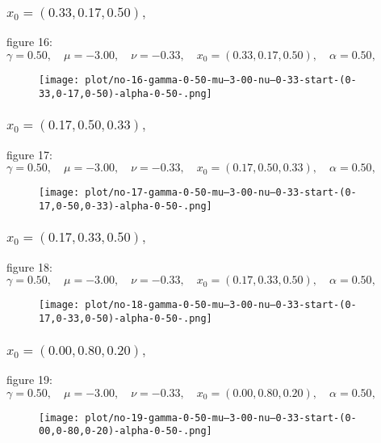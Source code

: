 \documentclass[a4paper]{article}
\begin{document}
\begin{multicols*}{2}
   \subsubsection{\(x_0 = (0.33,0.17,0.50),\quad \)}
   
figure 16: \(\gamma = 0.50,\quad \mu = -3.00,\quad \nu = -0.33,\quad x_0 = (0.33,0.17,0.50),\quad \alpha = 0.50,\quad \)
   \begin{figure}[H]
   \centering
   \texttt{[image: plot/no-16-gamma-0-50-mu--3-00-nu--0-33-start-(0-33,0-17,0-50)-alpha-0-50-.png]}
   \end{figure}
   

   \subsubsection{\(x_0 = (0.17,0.50,0.33),\quad \)}
   
figure 17: \(\gamma = 0.50,\quad \mu = -3.00,\quad \nu = -0.33,\quad x_0 = (0.17,0.50,0.33),\quad \alpha = 0.50,\quad \)
   \begin{figure}[H]
   \centering
   \texttt{[image: plot/no-17-gamma-0-50-mu--3-00-nu--0-33-start-(0-17,0-50,0-33)-alpha-0-50-.png]}
   \end{figure}
   

   \subsubsection{\(x_0 = (0.17,0.33,0.50),\quad \)}
   
figure 18: \(\gamma = 0.50,\quad \mu = -3.00,\quad \nu = -0.33,\quad x_0 = (0.17,0.33,0.50),\quad \alpha = 0.50,\quad \)
   \begin{figure}[H]
   \centering
   \texttt{[image: plot/no-18-gamma-0-50-mu--3-00-nu--0-33-start-(0-17,0-33,0-50)-alpha-0-50-.png]}
   \end{figure}
   

   \subsubsection{\(x_0 = (0.00,0.80,0.20),\quad \)}
   
figure 19: \(\gamma = 0.50,\quad \mu = -3.00,\quad \nu = -0.33,\quad x_0 = (0.00,0.80,0.20),\quad \alpha = 0.50,\quad \)
   \begin{figure}[H]
   \centering
   \texttt{[image: plot/no-19-gamma-0-50-mu--3-00-nu--0-33-start-(0-00,0-80,0-20)-alpha-0-50-.png]}
   \end{figure}
   


\end{multicols*}
\end{document}
